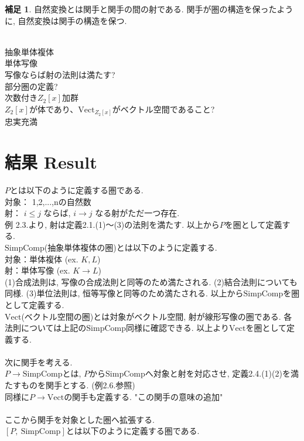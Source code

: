 \documentclass[a4paper]{jsarticle}
\theoremstyle{definition}
\newtheorem{hsk}[dfn]{補足}
\newcommand{\SimpComp}{{\mathrm{SimpComp}}}
\newcommand{\Fun}[2]{[#1,~#2]}
\newcommand{\Vect}{{\mathrm{Vect}}}
\begin{document}
\begin{hsk}
    自然変換とは関手と関手の間の射である. 関手が圏の構造を保ったように, 自然変換は関手の構造を保つ. 
\end{hsk}

\noindent\\
抽象単体複体\\
単体写像\\
写像ならば射の法則は満たす?\\
部分圏の定義?\\
次数付き$Z_2[x]加群$\\
$Z_2[x]$が体であり、$\Vect_{Z_2[x]}$がベクトル空間であること?\\
忠実充満\\



\section{結果 Result}
\noindent
$P$とは以下のように定義する圏である.\\
対象： 1,2,...,nの自然数  \\
射： $i \leq j$ ならば,  $i\rightarrow j$ なる射がただ一つ存在. \\
例 2.3.より, 射は定義2.1.(1)～(3)の法則を満たす. 以上から$P$を圏として定義する. \\
$\SimpComp$(抽象単体複体の圏)とは以下のように定義する. \\
対象：単体複体 (ex. $K, L$)\\
射：単体写像   (ex. $K\rightarrow L$)\\
(1)合成法則は, 写像の合成法則と同等のため満たされる. (2)結合法則についても同様. (3)単位法則は, 恒等写像と同等のため満たされる. 以上から$\SimpComp$を圏として定義する.\\
$\Vect$(ベクトル空間の圏)とは対象がベクトル空間, 射が線形写像の圏である. 各法則については上記の$\SimpComp$同様に確認できる. 
以上より$\Vect$を圏として定義する. \\
\noindent\\
次に関手を考える.\\
$P\rightarrow \SimpComp$とは, $P$から$\SimpComp$へ対象と射を対応させ, 定義2.4.(1)(2)を満たすものを関手とする. (例2.6.参照) \\
同様に$P \rightarrow \Vect$の関手も定義する. "この関手の意味の追加"\\
\noindent\\
ここから関手を対象とした圏へ拡張する. \\
$\Fun{P}{\SimpComp}$とは以下のように定義する圏である.\\
\end{document}
